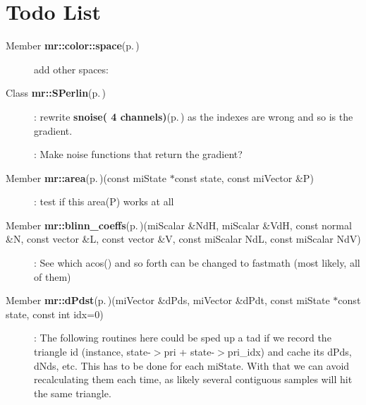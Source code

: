 \section{Todo List}\label{todo}
\label{_todo000001}
 \begin{description}
\item[Member {\bf mr::color::space}{\rm (p.\,\pageref{structmr_1_1color_w10})} ]add other spaces:\end{description}


\label{_todo000005}
 \begin{description}
\item[Class {\bf mr::SPerlin}{\rm (p.\,\pageref{classmr_1_1SPerlin})} ]: rewrite {\bf snoise( 4 channels)}{\rm (p.\,\pageref{mrRman__notes_8h_a14})} as the indexes are wrong and so is the gradient. 

: Make noise functions that return the gradient?\end{description}


\label{_todo000002}
 \begin{description}
\item[Member {\bf mr::area}{\rm (p.\,\pageref{namespacemr_a32})}(const mi\-State $\ast$const state, const mi\-Vector \&P) ]: test if this area(P) works at all\end{description}


\label{_todo000008}
 \begin{description}
\item[Member {\bf mr::blinn\_\-coeffs}{\rm (p.\,\pageref{namespacemr_a71})}(mi\-Scalar \&Nd\-H, mi\-Scalar \&Vd\-H, const normal \&N, const vector \&L, const vector \&V, const mi\-Scalar Nd\-L, const mi\-Scalar Nd\-V) ]: See which acos() and so forth can be changed to fastmath (most likely, all of them)\end{description}


\label{_todo000003}
 \begin{description}
\item[Member {\bf mr::d\-Pdst}{\rm (p.\,\pageref{namespacemr_a47})}(mi\-Vector \&d\-Pds, mi\-Vector \&d\-Pdt, const mi\-State $\ast$const state, const int idx=0) ]: The following routines here could be sped up a tad if we record the triangle id (instance, state-$>$pri + state-$>$pri\_\-idx) and cache its d\-Pds, d\-Nds, etc. This has to be done for each mi\-State. With that we can avoid recalculating them each time, as likely several contiguous samples will hit the same triangle.\end{description}


